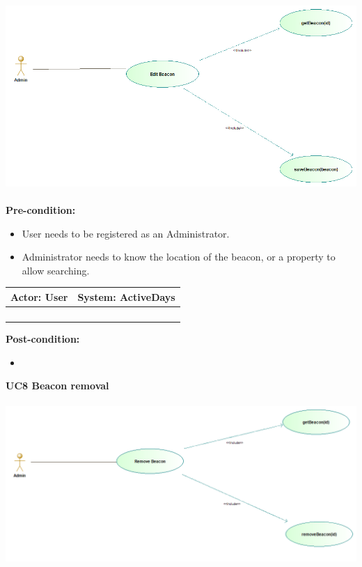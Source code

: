 \documentclass[11pt]{article}
\begin{document}
\includegraphics[scale=0.5]{./DiagramsTshepo/editBeacon.png}\\\\
\textbf{Pre-condition: }   \\
\begin{itemize}
	\item User needs to be registered as an Administrator.
	\item Administrator needs to know the location of the beacon, or a property to allow searching.
\end{itemize}
\begin{center}
	\begin{tabular}{ |p{8cm}|p{8cm}| }
		\hline
		\textbf{Actor:} User & \textbf{System:} ActiveDays \\
		\hline
		&  \\
		\hline
		&  \\
		\hline
		& \\   
		\hline
		& \\
		\hline
	\end{tabular}
\end{center}		
\textbf{Post-condition: } \\
\begin{itemize}
	\item 
\end{itemize}
\textbf{UC8 Beacon removal} \\\\
\includegraphics[scale=0.5]{./DiagramsTshepo/removeBeacon.png}\\\\
\end{document}
